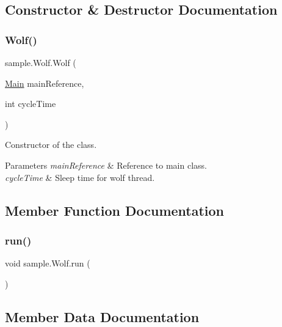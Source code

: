 \subsection{Constructor \& Destructor Documentation}
\mbox{\label{classsample_1_1_wolf_a190e576919c4c433f8289a442cc849e2}} 
\subsubsection{\texorpdfstring{Wolf()}{Wolf()}}
{\footnotesize\ttfamily sample.\+Wolf.\+Wolf (\begin{DoxyParamCaption}\item[{\hyperlink{classsample_1_1_main}{Main}}]{main\+Reference,  }\item[{int}]{cycle\+Time }\end{DoxyParamCaption})}

Constructor of the class. 
\begin{DoxyParams}{Parameters}
{\em main\+Reference} & Reference to main class. \\
\hline
{\em cycle\+Time} & Sleep time for wolf thread. \\
\hline
\end{DoxyParams}


\subsection{Member Function Documentation}
\mbox{\label{classsample_1_1_wolf_a6b5c06d824289bd9e37b91fb5f94c4e0}} 
\subsubsection{\texorpdfstring{run()}{run()}}
{\footnotesize\ttfamily void sample.\+Wolf.\+run (\begin{DoxyParamCaption}{ }\end{DoxyParamCaption})}



\subsection{Member Data Documentation}
\mbox{\label{classsample_1_1_wolf_ae17bddbc1ec318716c546e2aed500dbe}} 
